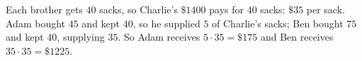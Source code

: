Each brother gets $40$ sacks, so Charlie's $\$1400$ pays for $40$ sacks: $\$35$ per sack. Adam bought $45$ and kept $40$, so he supplied $5$ of Charlie's sacks; Ben bought $75$ and kept $40$, supplying $35$. So Adam receives $5\cdot35=\boxed{\$175}$ and Ben receives $35\cdot35=\boxed{\$1225}$.
